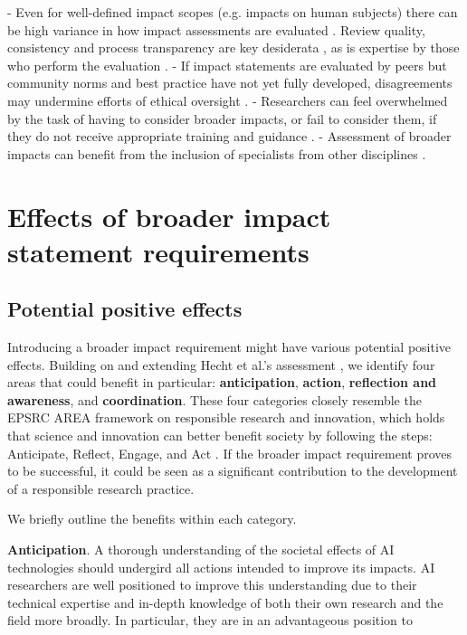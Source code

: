\documentclass[11pt,english]{article}
\begin{document}
-  Even for well-defined impact scopes (e.g. impacts on human subjects) there can be high variance in how impact assessments are evaluated \citep{dziak_variations_2005,larson_survey_2004,shah_how_2004,mcwilliams_problematic_2003,goldman_inconsistency_1982}. Review quality, consistency and process transparency are key desiderata \citep{whitney_principal_2008}, as is expertise by those who perform the evaluation \citep{bozeman_broad_2009,holbrook_peer_2011,bozeman_socio-economic_2017}.
-  If impact statements are evaluated by peers but community norms and best practice have not yet fully developed, disagreements may undermine efforts of ethical oversight \citep{kenneally_cyber-security_2014}.
-  Researchers can feel overwhelmed by the task of having to consider broader impacts, or fail to consider them, if they do not receive appropriate training and guidance \citep{owen_responsible_2010}.
-  Assessment of broader impacts can benefit from the inclusion of specialists from other disciplines \citep{owen_responsible_2010}.

\section{Effects of broader impact statement requirements}

\subsection{Potential positive effects}

Introducing a broader impact requirement might have various potential positive effects. Building on and extending Hecht et al.'s assessment \citep{hecht_its_2018}, we identify four areas that could benefit in particular: \textbf{anticipation}, \textbf{action}, \textbf{reflection and awareness}, and \textbf{coordination}. These four categories closely resemble the EPSRC AREA framework on responsible research and innovation, which holds that science and innovation can better benefit society by following the steps: Anticipate, Reflect, Engage, and Act \citep{epsrc_anticipate_2020,owen_responsible_2012}. If the broader impact requirement proves to be successful, it could be seen as a significant contribution to the development of a responsible research practice. 

We briefly outline the benefits within each category. 

\textbf{Anticipation}. A thorough understanding of the societal effects of AI technologies should undergird all actions intended to improve its impacts. 
AI researchers are well positioned to improve this understanding due to their technical expertise and in-depth knowledge of both their own research and the field more broadly. In particular, they are in an advantageous position to 
\end{document}
